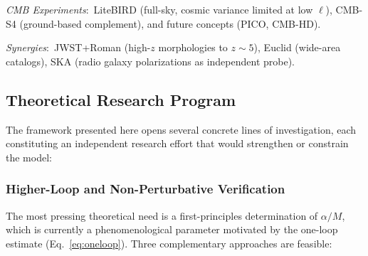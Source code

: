 \documentclass[aps,prd,twocolumn,superscriptaddress,showpacs,preprintnumbers,nofootinbib,longbibliography,floatfix]{revtex4-2}
\begin{document}
\textit{CMB Experiments}:~LiteBIRD (full-sky, cosmic variance limited at low $\ell$), CMB-S4 (ground-based complement), and future concepts (PICO, CMB-HD).

\textit{Synergies}:~JWST+Roman (high-$z$ morphologies to $z\sim 5$), Euclid (wide-area catalogs), SKA (radio galaxy polarizations as independent probe).

\subsection{Theoretical Research Program}\label{sec:theory_program}

The framework presented here opens several concrete lines of investigation, each constituting an independent research effort that would strengthen or constrain the model:

\subsubsection{Higher-Loop and Non-Perturbative Verification}

The most pressing theoretical need is a first-principles determination of $\alpha/M$, which is currently a phenomenological parameter motivated by the one-loop estimate (Eq.~\ref{eq:oneloop}). Three complementary approaches are feasible:
\end{document}
